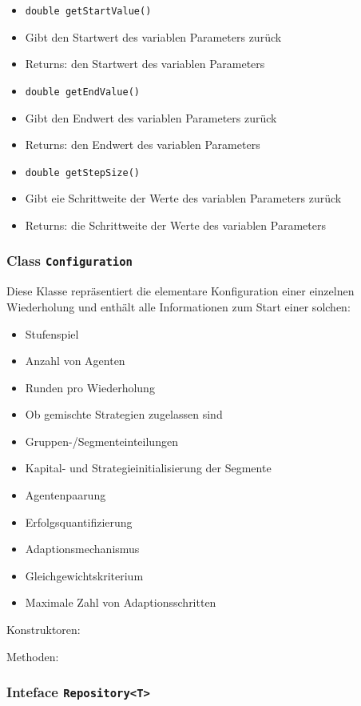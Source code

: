\documentclass[parskip=full,11pt]{scrartcl}
\begin{document}
\begin{itemize}
	\item \texttt{double getStartValue()}
	\item[] Gibt den Startwert des variablen Parameters zurück
	\item[] Returns: den Startwert des variablen Parameters
	
	\item \texttt{double getEndValue()}
	\item[] Gibt den Endwert des variablen Parameters zurück
	\item[] Returns: den Endwert des variablen Parameters
	
	\item \texttt{double getStepSize()}
	\item[] Gibt eie Schrittweite der Werte des variablen Parameters zurück
	\item[] Returns: die Schrittweite der Werte des variablen Parameters
	
	
\end{itemize}

\subsubsection{Class \texttt{Configuration}}
Diese Klasse repräsentiert die elementare Konfiguration einer einzelnen Wiederholung und enthält alle Informationen zum Start einer solchen:
\begin{itemize}\itemsep -10pt
\item Stufenspiel
\item Anzahl von Agenten
\item Runden pro Wiederholung
\item Ob gemischte Strategien zugelassen sind
\item Gruppen-/Segmenteinteilungen
\item Kapital- und Strategieinitialisierung der Segmente
\item Agentenpaarung
\item Erfolgsquantifizierung
\item Adaptionsmechanismus
\item Gleichgewichtskriterium
\item Maximale Zahl von Adaptionsschritten
\end{itemize}

Konstruktoren:

Methoden:

\subsubsection{Inteface \texttt{Repository<T>}}
\end{document}
